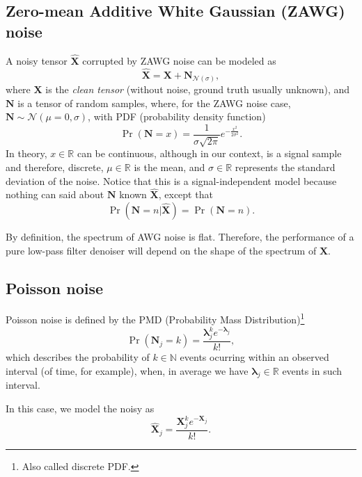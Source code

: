 \documentclass{article}
\begin{document}
\subsection{Zero-mean Additive White Gaussian (ZAWG) noise}
A noisy tensor $\hat{\mathbf X}$ corrupted by ZAWG noise can be modeled as
\begin{equation}
  \hat{\mathbf X} = {\mathbf X} + {\mathbf N}_{{\mathcal N}(\sigma)},
  \label{eq:AWG_noise_model}  
\end{equation}
where $\mathbf{X}$ is the \emph{clean tensor} (without noise, ground
truth usually unknown),
and ${\mathbf N}$ is a tensor of random samples,
where, for the ZAWG noise case,
${\mathbf N}\sim{\mathcal N}(\mu=0,\sigma)$, with PDF (probability density
function)
\begin{equation}
  \Pr({\mathbf N}{=}x) = \frac 1 {\sigma\sqrt{2\pi}} e^{-\frac{x^2}{2\sigma^2} }.
\end{equation}
In theory, $x\in\mathbb{R}$ can be continuous, although in our
context, is a signal sample and therefore, discrete,
$\mu\in\mathbb{R}$ is the mean, and $\sigma\in\mathbb{R}$ represents
the standard deviation of the noise. Notice that this is a
signal-independent model because nothing can said about ${\mathbf N}$
known $\hat{\mathbf X}$, except that
\begin{equation}
  \Pr(\mathbf{N}{=}n|\hat{\mathbf{X}}) = \Pr(\mathbf{N}{=}n).
\end{equation}

By definition, the spectrum of AWG noise is flat. Therefore, the
performance of a pure low-pass filter denoiser will depend on the
shape of the spectrum of $\mathbf{X}$.

\subsection{Poisson noise}
Poisson noise is defined by the PMD (Probability Mass
Distribution)\footnote{Also called discrete PDF.}
\begin{equation}
  \Pr({\mathbf N}_j{=}k) = \frac{\mathbf{\lambda}_j^ke^{-\mathbf{\lambda}_j}}{k!},
  \label{eq:PN}
\end{equation}
which describes the probability of $k\in\mathbb{N}$ events ocurring
within an observed interval (of time, for example), when, in average
we have ${\mathbf \lambda}_j\in\mathbb{R}$ events in such interval.

In this case, we model the noisy as
\begin{equation}
  \hat{{\mathbf X}}_j = \frac{{\mathbf X}_j^{k} e^{-{\mathbf X}_j}}{k!}.
\end{equation}
\end{document}
